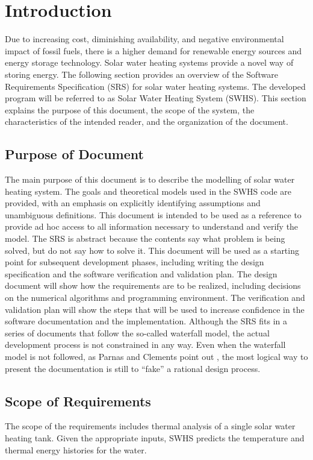 \documentclass[12pt]{article}
\begin{document}
\section{Introduction}
\label{Sec:Intro}
Due to increasing cost, diminishing availability, and negative environmental impact of fossil fuels, there is a higher demand for renewable energy sources and energy storage technology. Solar water heating systems provide a novel way of storing energy.
The following section provides an overview of the Software Requirements Specification (SRS) for solar water heating systems. The developed program will be referred to as Solar Water Heating System (SWHS). This section explains the purpose of this document, the scope of the system, the characteristics of the intended reader, and the organization of the document.
\subsection{Purpose of Document}
\label{Sec:DocPurpose}
The main purpose of this document is to describe the modelling of solar water heating system. The goals and theoretical models used in the SWHS code are provided, with an emphasis on explicitly identifying assumptions and unambiguous definitions. This document is intended to be used as a reference to provide ad hoc access to all information necessary to understand and verify the model. The SRS is abstract because the contents say what problem is being solved, but do not say how to solve it.
This document will be used as a starting point for subsequent development phases, including writing the design specification and the software verification and validation plan. The design document will show how the requirements are to be realized, including decisions on the numerical algorithms and programming environment. The verification and validation plan will show the steps that will be used to increase confidence in the software documentation and the implementation. Although the SRS fits in a series of documents that follow the so-called waterfall model, the actual development process is not constrained in any way. Even when the waterfall model is not followed, as Parnas and Clements point out \cite{parnasClements1986}, the most logical way to present the documentation is still to ``fake'' a rational design process.
\subsection{Scope of Requirements}
\label{Sec:ReqsScope}
The scope of the requirements includes thermal analysis of a single solar water heating tank. Given the appropriate inputs, SWHS predicts the temperature and thermal energy histories for the water.
\end{document}
